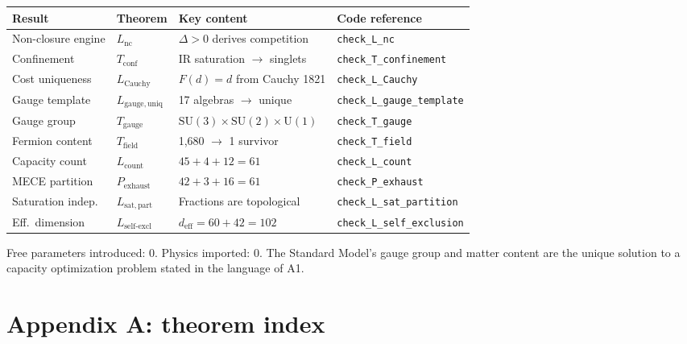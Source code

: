 \documentclass[11pt]{article}
\newcommand{\SU}{\mathrm{SU}}
\newcommand{\U}{\mathrm{U}}
\begin{document}
\begin{center}
\footnotesize
\begin{tabular}{lp{2.8cm}p{4.2cm}l}
\toprule
\textbf{Result} & \textbf{Theorem} & \textbf{Key content} & \textbf{Code reference} \\
\midrule
Non-closure engine & $L_{\mathrm{nc}}$ & $\Delta > 0$ derives competition & \texttt{check\_L\_nc} \\
Confinement & $T_{\mathrm{conf}}$ & IR saturation $\to$ singlets & \texttt{check\_T\_confinement} \\
Cost uniqueness & $L_{\mathrm{Cauchy}}$ & $F(d) = d$ from Cauchy 1821 & \texttt{check\_L\_Cauchy} \\
Gauge template & $L_{\mathrm{gauge,uniq}}$ & 17 algebras $\to$ unique & \texttt{check\_L\_gauge\_template} \\
Gauge group & $T_{\mathrm{gauge}}$ & $\SU(3) \!\times\! \SU(2) \!\times\! \U(1)$ & \texttt{check\_T\_gauge} \\
Fermion content & $T_{\mathrm{field}}$ & 1{,}680 $\to$ 1 survivor & \texttt{check\_T\_field} \\
Capacity count & $L_{\mathrm{count}}$ & $45 + 4 + 12 = 61$ & \texttt{check\_L\_count} \\
MECE partition & $P_{\mathrm{exhaust}}$ & $42 + 3 + 16 = 61$ & \texttt{check\_P\_exhaust} \\
Saturation indep. & $L_{\mathrm{sat,part}}$ & Fractions are topological & \texttt{check\_L\_sat\_partition} \\
Eff.\ dimension & $L_{\mathrm{self\text{-}excl}}$ & $d_{\mathrm{eff}} = 60 + 42 = 102$ & \texttt{check\_L\_self\_exclusion} \\
\bottomrule
\end{tabular}
\end{center}

Free parameters introduced: 0.  Physics imported: 0.  The Standard Model's gauge group and matter content are the unique solution to a capacity optimization problem stated in the language of A1.


\section{Appendix A: theorem index}
\label{app:theorems}
\end{document}
